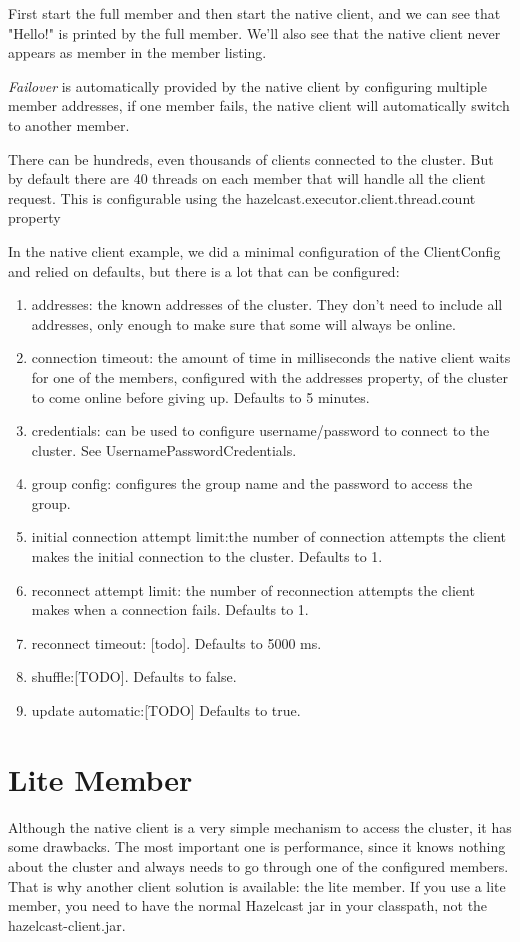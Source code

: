 First start the full member and then start the native client, and we can see that "Hello!" is printed by the full member. We'll also see that the native client never appears as member in the member listing.	
 
\emph{Failover} is automatically provided by the native client by configuring multiple member addresses, if one member fails, the native client will automatically switch to another member.

There can be hundreds, even thousands of clients connected to the cluster. But by default there are 40 threads on each member that will handle all the client request. This is configurable using the hazelcast.executor.client.thread.count property

In the native client example, we did a minimal configuration of the ClientConfig and relied on defaults, but there is a lot that can be configured:
\begin{enumerate}
\item addresses: the known addresses of the cluster. They don't need to include all addresses, only enough to make sure that some will always be online.
\item connection timeout: the amount of time in milliseconds the native client waits for one of the members, configured with the addresses property, of the cluster to come online before giving up. Defaults to 5 minutes.
\item credentials: can be used to configure username/password to connect to the cluster. See UsernamePasswordCredentials.
\item group config: configures the group name and the password to access the group.
\item initial connection attempt limit:the  number of connection attempts the client makes the initial connection to the cluster. Defaults to 1.
\item reconnect attempt limit: the number of reconnection attempts the client makes when a connection fails. Defaults to 1.
\item reconnect timeout: [todo]. Defaults to 5000 ms.
\item shuffle:[TODO]. Defaults to false.
\item update automatic:[TODO] Defaults to true.
\end{enumerate}

\section{Lite Member}
Although the native client is a very simple mechanism to access the cluster, it has some drawbacks. The most important one is performance, since it knows nothing about the cluster and always needs to go through one of the configured members. That is why another client solution is available: the lite member. If you use a lite member, you need to have the normal Hazelcast jar in your classpath, not the hazelcast-client.jar.

